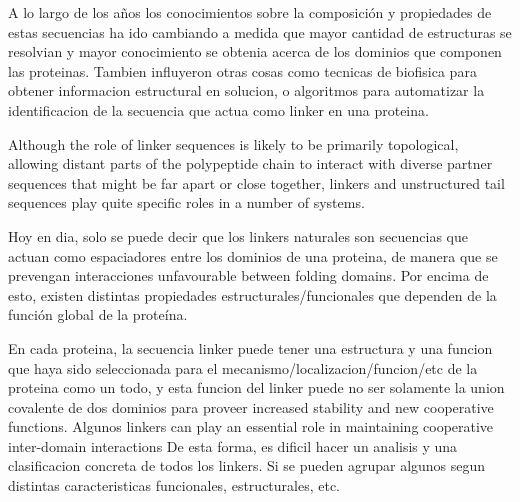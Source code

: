 % 


A lo largo de los años los conocimientos sobre la composición y propiedades de estas secuencias ha ido cambiando
a medida que mayor cantidad de estructuras se resolvian y mayor conocimiento se obtenia acerca de los dominios que componen 
las proteinas. Tambien influyeron otras cosas como tecnicas de biofisica para obtener informacion estructural en solucion,
o algoritmos para automatizar la identificacion de la secuencia que actua como linker en una proteina.



Although the role of linker sequences is likely to be primarily topological, allowing distant parts of the polypeptide chain to interact with diverse partner sequences that might be far apart or close together, 
linkers and unstructured tail sequences play quite specific roles in a number of systems.

Hoy en dia, solo se puede decir que los linkers naturales son secuencias que actuan como espaciadores entre los dominios de una proteina, de manera que se prevengan interacciones unfavourable between folding domains. 
Por encima de esto, existen distintas propiedades estructurales/funcionales que dependen de la función global de la proteína.

En cada proteina, la secuencia linker puede tener una estructura y una funcion que haya sido seleccionada para el mecanismo/localizacion/funcion/etc de la proteina como un todo, y esta funcion del linker puede no ser solamente la union covalente de dos dominios para proveer increased stability and new cooperative functions.
Algunos linkers can play an essential role in maintaining cooperative inter-domain interactions
De esta forma, es dificil hacer un analisis y una clasificacion concreta de todos los linkers. Si se pueden agrupar algunos segun distintas caracteristicas funcionales, estructurales, etc.






